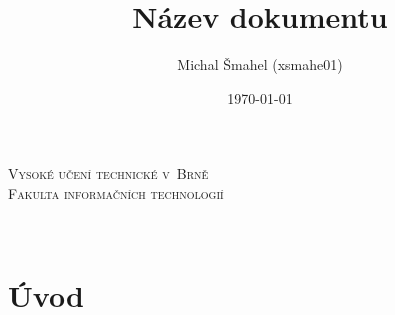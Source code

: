 \documentclass[a4paper, 11pt, final]{article}
\author{Michal Šmahel (xsmahe01)}
\date{\today}
\title{Název dokumentu}
\makeatletter
\newcommand\@course{}
\makeatother
\begin{document}
\begin{titlepage}
\makeatletter
\begin{center}
    \Huge \textsc{Vysoké učení technické v~Brně}\\
    \huge \textsc{Fakulta informačních technologií}
    
    
    \LARGE \@course\\
    \Huge \@title
    
\end{center}

\Large \noindent \@date \hfill \@author
\makeatother
\end{titlepage}

\tableofcontents
\newpage



\section{Úvod}



\newpage
\printbibliography[title=Použitá literatura]
\end{document}
